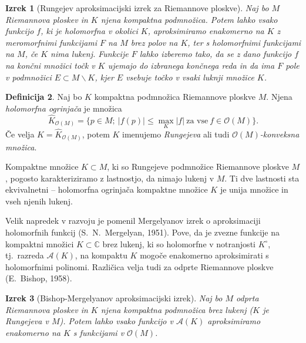 \documentclass[12pt,a4paper,twoside]{article}
\theoremstyle{definition} %
\newtheorem{definicija}{Definicija}[section]
\theoremstyle{plain} %
\newtheorem{izrek}[definicija]{Izrek}
\numberwithin{equation}{section}  %
\newcommand{\C}{\mathbb C}
\begin{document}
\begin{izrek}[Rungejev aproksimacijski izrek za Riemannove ploskve] \label{izr:Runge}
Naj bo $M$ Riemannova ploskev in $K$ njena kompaktna podmnožica. 
Potem lahko vsako funkcijo $f$, ki je holomorfna v okolici $K$, aproksimiramo enakomerno na $K$ z meromorfnimi funkcijami $F$ na $M$ brez polov na $K$, ter s holomorfnimi funkcijami na $M$, če $K$ nima lukenj.
Funkcije $F$ lahko izberemo tako, da se z dano funkcijo $f$ na končni množici točk v $K$ ujemajo do izbranega končnega reda in da ima $F$ pole v podmnožici $E \subset M \backslash K$, kjer $E$ vsebuje točko v vsaki luknji množice $K$. 
\end{izrek}

\begin{definicija}
Naj bo $K$ kompaktna podmnožica Riemannove ploskve $M$. Njena \emph{holomorfna ogrinjača} je množica 
\begin{equation}
\widehat{K}_{\mathcal{O}(M)} = \{p \in M ; \ |f(p)| \leq \max_{K} |f| \ \text{za vse} \ f \in \mathcal{O}(M) \}.
\end{equation}
Če velja $K = \widehat{K}_{\mathcal{O}(M)}$, potem $K$ imenujemo \emph{Rungejeva} ali tudi \emph{$\mathcal{O}(M)$-konveksna množica}.
\end{definicija}

Kompaktne množice $K \subset M$, ki so Rungejeve podmnožice Riemannove ploskve $M$, pogosto karakteriziramo z lastnostjo, da nimajo lukenj v $M$. Ti dve lastnosti sta ekvivalnetni -- holomorfna ogrinjača kompaktne množice $K$ je unija množice in vseh njenih lukenj. \newline

Velik napredek v razvoju je pomenil Mergelyanov izrek o aproksimaciji holomorfnih funkcij (S.~N.~Mergelyan, 1951). Pove, da je zvezne funkcije na kompaktni množici $K \subset \C$ brez lukenj, ki so holomorfne v notranjosti $K^{\circ}$, tj.~razreda $\mathcal{A}(K)$, na kompaktu $K$ mogoče enakomerno aproksimirati s holomorfnimi polinomi.
Različica velja tudi za odprte Riemannove ploskve (E.~Bishop, 1958).

\begin{izrek} [Bishop-Mergelyanov aproksimacijski izrek] \label{izr:Bishop-Mergelyan}
Naj bo $M$ odprta Riemannova ploskev in $K$ njena kompaktna podmnožica brez lukenj ($K$ je Rungejeva v $M$). Potem lahko vsako funkcijo v $\mathcal{A}(K)$ aproksimiramo enakomerno na $K$ s funkcijami v $\mathcal{O}(M)$.
\end{izrek}
\end{document}
